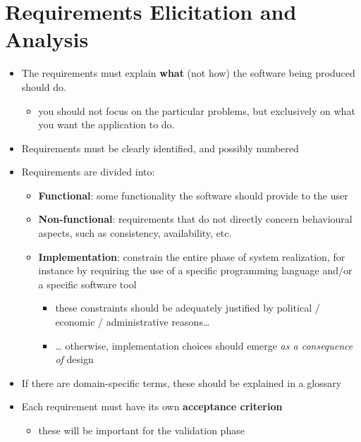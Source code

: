 \documentclass{scrartcl}
\begin{document}
\section{Requirements Elicitation and Analysis}\label{requirements}

\begin{itemize}
  \item The requirements must explain \textbf{what} (not how) the software
  being produced should do.
  \begin{itemize}
    \item you should not focus on the particular problems, but exclusively on
    what you want the application to do.
  \end{itemize}

  \item Requirements must be clearly identified, and possibly numbered

  \item Requirements are divided into:
  \begin{itemize}
    \item \textbf{Functional}: some functionality the software should provide to the user

    \item \textbf{Non-functional}: requirements that do not directly concern behavioural aspects, such as consistency, availability, etc.

    \item \textbf{Implementation}: constrain the entire phase of system realization, 
    for instance by requiring the use of a specific programming language and/or a specific software tool
    \begin{itemize}
      \item these constraints should be adequately justified by political / economic / administrative reasons\ldots{}
      \item \ldots{} otherwise, implementation choices should emerge \emph{as  a consequence of} design
    \end{itemize}
  \end{itemize}

  \item If there are domain-specific terms, these should be explained in a glossary
  
  \item Each requirement must have its own \textbf{acceptance criterion}
  \begin{itemize}
    \item these will be important for the validation phase
  \end{itemize}
\end{itemize}
\end{document}

